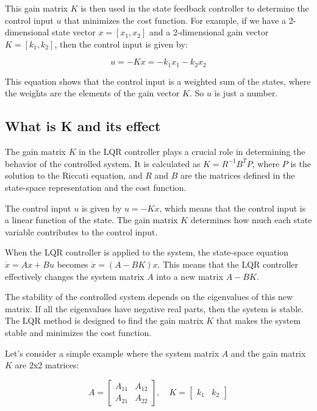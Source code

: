 \documentclass[11pt,twocolumn,twoside,lineno]{pnas-new}
\begin{document}
This gain matrix \(K\) is then used in the state feedback controller to determine the control input \(u\) that minimizes the cost function. For example, if we have a 2-dimensional state vector \(x = [x_1, x_2]\) and a 2-dimensional gain vector \(K = [k_1, k_2]\), then the control input is given by:

\begin{equation}
u = -Kx = -k_1x_1 - k_2x_2
\end{equation}

This equation shows that the control input is a weighted sum of the states, where the weights are the elements of the gain vector \(K\). So $u$ is just a number.

\subsection{What is K and its effect}
The gain matrix \(K\) in the LQR controller plays a crucial role in determining the behavior of the controlled system. It is calculated as \(K = R^{-1}B^TP\), where \(P\) is the solution to the Riccati equation, and \(R\) and \(B\) are the matrices defined in the state-space representation and the cost function.

The control input \(u\) is given by \(u = -Kx\), which means that the control input is a linear function of the state. The gain matrix \(K\) determines how much each state variable contributes to the control input. 

When the LQR controller is applied to the system, the state-space equation \(\dot{x} = Ax + Bu\) becomes \(\dot{x} = (A - BK)x\). This means that the LQR controller effectively changes the system matrix \(A\) into a new matrix \(A - BK\). 

The stability of the controlled system depends on the eigenvalues of this new matrix. If all the eigenvalues have negative real parts, then the system is stable. The LQR method is designed to find the gain matrix \(K\) that makes the system stable and minimizes the cost function.

Let's consider a simple example where the system matrix \(A\) and the gain matrix \(K\) are 2x2 matrices:

\begin{equation}
A = \begin{bmatrix} A_{11} & A_{12} \\ A_{21} & A_{22} \end{bmatrix}, \quad K = \begin{bmatrix} k_{1} & k_{2} \end{bmatrix}
\end{equation}
\end{document}
